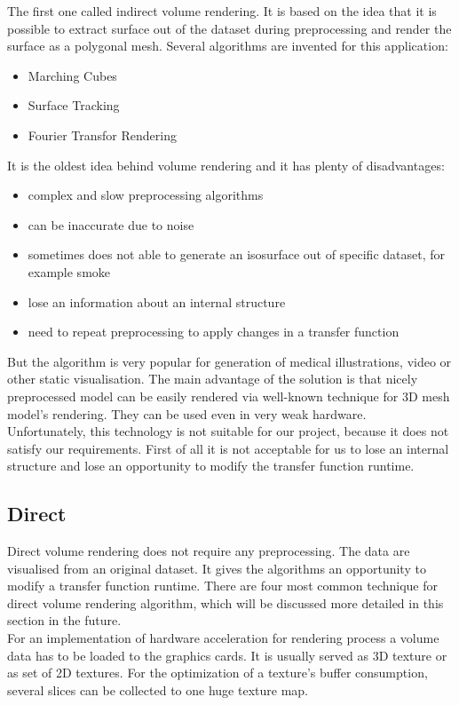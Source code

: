 \documentclass[twoside, english, 11pt]{report}
\begin{document}
The first one called indirect volume rendering. It is based on the idea that it is possible to extract surface out of the dataset during preprocessing and render the surface as a polygonal mesh. Several algorithms are invented for this application:
\begin{itemize}
\item Marching Cubes
\item Surface Tracking
\item Fourier Transfor Rendering
\end{itemize}
It is the oldest idea behind volume rendering and it has plenty of disadvantages:
\begin{itemize}
\item complex and slow preprocessing algorithms
\item can be inaccurate due to noise
\item sometimes does not able to generate an isosurface out of specific dataset, for example smoke
\item lose an information about an internal structure
\item need to repeat preprocessing to apply changes in a transfer function
\end{itemize}

But the algorithm is very popular for generation of medical illustrations, video or other static visualisation. The main advantage of the solution is that nicely preprocessed model can be easily rendered via well-known technique for 3D mesh model's rendering. They can be used even in very weak hardware.\\

Unfortunately, this technology is not suitable for our project, because it does not satisfy our requirements. First of all it is not acceptable for us to lose an internal structure and lose an opportunity to modify the transfer function runtime.

\subsection{Direct}
Direct volume rendering does not require any preprocessing. The data are visualised from an original dataset. It gives the algorithms an opportunity to modify a transfer function runtime. There are four most common technique for direct volume rendering algorithm, which will be discussed more detailed in this section in the future.\\

For an implementation of hardware acceleration for rendering process a volume data has to be loaded to the graphics cards. It is usually served as 3D texture or as set of 2D textures. For the optimization of a texture's buffer consumption, several slices can be collected to one huge texture map. 
\end{document}
